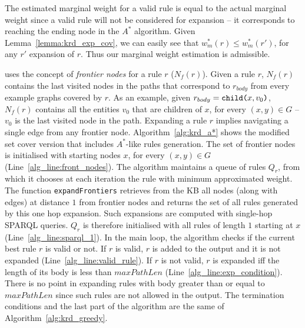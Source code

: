 The estimated marginal weight for a valid rule is equal to the actual marginal weight since a valid rule will not be considered for expansion -- it corresponds to reaching the ending node in the $A^*$ algorithm. Given Lemma~\ref{lemma:krd_exp_cov}, we can easily see that $w_m^*(r) \leq w_m^*(r')$, for any $r'$ expansion of $r$. Thus our marginal weight estimation is admissible.

\krd uses the concept of \emph{frontier nodes} for a rule $r$ ($N_f(r)$). Given a rule $r$, $N_f(r)$ contains the last visited nodes in the paths that correspond to $r_{body}$ from every example graphs covered by $r$. As an example, given $r_{body} = \texttt{child(}x,v_0\texttt{)}$, $N_f(r)$ contains all the entities $v_0$ that are children of $x$, for every $(x,y) \in G$ -- $v_0$ is the last visited node in the path. Expanding a rule $r$ implies navigating a single edge from any frontier node. Algorithm~\ref{alg:krd_a*} shows the modified set cover version that includes $A^*$-like rules generation. The set of frontier nodes is initialised with starting nodes $x$, for every $(x,y) \in G$ (Line~\ref{alg_line:front_nodes}). The algorithm maintains a queue of rules $Q_r$, from which it chooses at each iteration the rule with minimum approximated weight. The function \texttt{expandFrontiers} retrieves from the KB all nodes (along with edges) at distance $1$ from frontier nodes and returns the set of all rules generated by this one hop expansion. Such expansions are computed with single-hop SPARQL queries. $Q_r$ is therefore initialised with all rules of length $1$ starting at $x$ (Line~\ref{alg_line:sparql_1}). In the main loop, the algorithm checks if the current best rule $r$ is valid or not. If $r$ is valid, $r$ is added to the output and it is not expanded (Line~\ref{alg_line:valid_rule}). If $r$ is not valid, $r$ is expanded iff the length of its body is less than $maxPathLen$ (Line~\ref{alg_line:exp_condition}). There is no point in expanding rules with body greater than or equal to $maxPathLen$ since such rules are not allowed in the output. The termination conditions and the last part of the algorithm are the same of Algorithm~\ref{alg:krd_greedy}.



